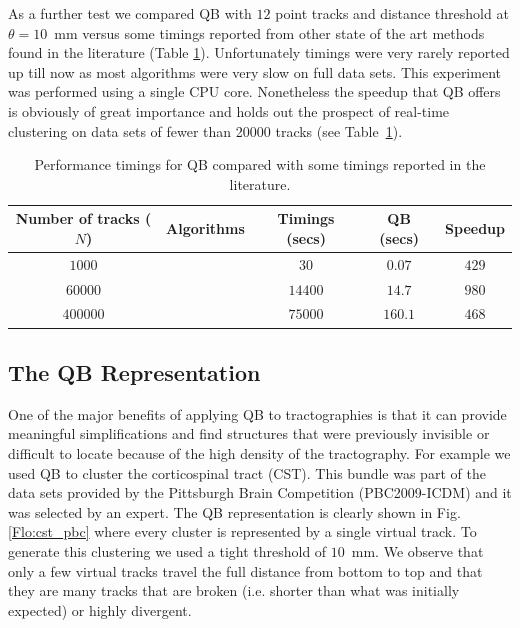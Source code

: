\documentclass{bioinfo}
\begin{document}
As a further test we compared QB with $12$ point tracks and distance
threshold at $\theta=10$~mm versus some timings reported from other
state of the art methods found in the literature (Table
\ref{Flo:timings}). Unfortunately timings were very rarely reported up
till now as most algorithms were very slow on full data sets. This
experiment was performed using a single CPU core. Nonetheless the
speedup that QB offers is obviously of great importance and holds out
the prospect of real-time clustering on data sets of fewer than \num{20000}
tracks (see Table~\ref{Flo:timings}).

%
\begin{table}
\scriptsize\addtolength{\tabcolsep}{-5pt}
\caption{Performance timings for QB compared with some timings
  reported in the literature.\label{Flo:timings}}
\begin{centering}
\begin{tabular}{ccccc}
\hline 
Number of tracks ($N$) & Algorithms & Timings (secs) & QB (secs) & Speedup\tabularnewline
\hline
$1000$ & \cite{wang2010tractography} & $30$ & $0.07$ & $429$\tabularnewline
$\num{60000}$ & \cite{wang2010tractography} & $\num{14400}$ & $14.7$ & $980$\tabularnewline
$\num{400000}$ & \cite{Visser2010} & $\num{75000}$ & $160.1$ & $468$\tabularnewline
\hline
\end{tabular}
\par\end{centering}
\end{table}

\subsection{The QB Representation\label{QB_Representation}}

One of the major benefits of applying QB to tractographies is that it
can provide meaningful simplifications and find structures that were
previously invisible or difficult to locate because of the high density
of the tractography. For example we used QB to cluster the corticospinal
tract (CST). This bundle was part of the data sets provided by the
Pittsburgh Brain Competition (PBC2009-ICDM) and it was selected by an
expert. The QB representation is clearly shown in Fig.\ref{Flo:cst_pbc} where
every cluster is represented by a single virtual track. To generate this
clustering we used a tight threshold of $10$~mm. We observe that only a
few virtual tracks travel the full distance from bottom to top and that
they are many tracks that are broken (i.e. shorter than what was
initially expected) or highly divergent.
\end{document}
